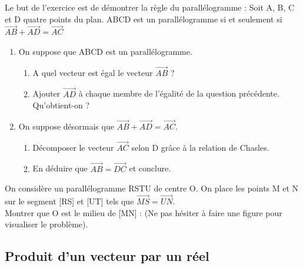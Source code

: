 {\begin{Exercice} %
Le but de l'exercice est de démontrer la règle du parallélogramme : Soit A, B, C et D quatre points du plan. ABCD est un parallélogramme si et seulement si $\overrightarrow{AB}+\overrightarrow{AD} =\overrightarrow{AC}$
\begin{enumerate}
\item On suppose que ABCD est un parallélogramme.
\begin{enumerate}
\item A quel vecteur est égal le vecteur $ \overrightarrow{AB} $ ?
\item Ajouter $ \overrightarrow{AD} $ à chaque membre de l'égalité de la question précédente. Qu'obtient-on ?
\end{enumerate}
\item On suppose désormais que $\overrightarrow{AB}+\overrightarrow{AD} =\overrightarrow{AC}$.
\begin{enumerate}
\item Décomposer le vecteur $ \overrightarrow{AC} $ selon D grâce à la relation de Chasles.
\item En déduire que $ \overrightarrow{AB}=\overrightarrow{DC} $ et conclure.
\end{enumerate}
\end{enumerate}
\end{Exercice} 



\begin{Exercice} %
On considère un parallélogramme RSTU de centre O. On place les points M et N sur le
segment [RS] et [UT] tels que $ \overrightarrow{MS}=\overrightarrow{UN} $.\\
 Montrer que O est le milieu de [MN] : (Ne pas hésiter à faire une figure pour visualiser le problème).
\end{Exercice} 

\newpage

\subsection*{Produit d'un vecteur par un réel}

}
